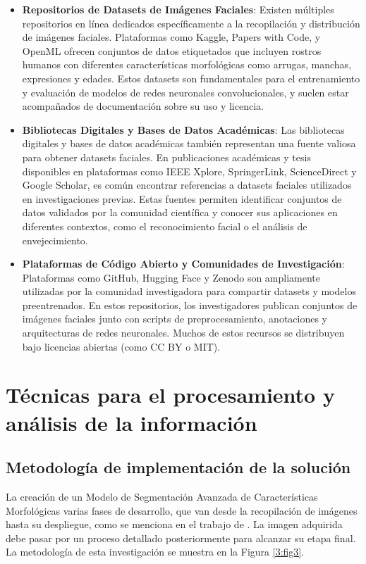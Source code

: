 \begin{itemize}
    \item \textbf{Repositorios de Datasets de Imágenes Faciales}: Existen múltiples repositorios en línea dedicados específicamente a la recopilación y distribución de imágenes faciales. Plataformas como Kaggle, Papers with Code, y OpenML ofrecen conjuntos de datos etiquetados que incluyen rostros humanos con diferentes características morfológicas como arrugas, manchas, expresiones y edades. Estos datasets son fundamentales para el entrenamiento y evaluación de modelos de redes neuronales convolucionales, y suelen estar acompañados de documentación sobre su uso y licencia.
	\item \textbf{Bibliotecas Digitales y Bases de Datos Académicas}: Las bibliotecas digitales y bases de datos académicas también representan una fuente valiosa para obtener datasets faciales. En publicaciones académicas y tesis disponibles en plataformas como IEEE Xplore, SpringerLink, ScienceDirect y Google Scholar, es común encontrar referencias a datasets faciales utilizados en investigaciones previas. Estas fuentes permiten identificar conjuntos de datos validados por la comunidad científica y conocer sus aplicaciones en diferentes contextos, como el reconocimiento facial o el análisis de envejecimiento.
	\item \textbf{Plataformas de Código Abierto y Comunidades de Investigación}: Plataformas como GitHub, Hugging Face y Zenodo son ampliamente utilizadas por la comunidad investigadora para compartir datasets y modelos preentrenados. En estos repositorios, los investigadores publican conjuntos de imágenes faciales junto con scripts de preprocesamiento, anotaciones y arquitecturas de redes neuronales. Muchos de estos recursos se distribuyen bajo licencias abiertas (como CC BY o MIT).
  \end{itemize}


\section{Técnicas para el procesamiento y análisis de la información}

\subsection{Metodología de implementación de la solución}

La creación de un Modelo de Segmentación Avanzada de Características Morfológicas varias fases de desarrollo, que van desde la recopilación de imágenes hasta su despliegue, como se menciona en el trabajo de \cite{yoon2023}. La imagen adquirida debe pasar por un proceso detallado posteriormente para alcanzar su etapa final. La metodología de esta investigación se muestra en la Figura \ref{3:fig3}.

